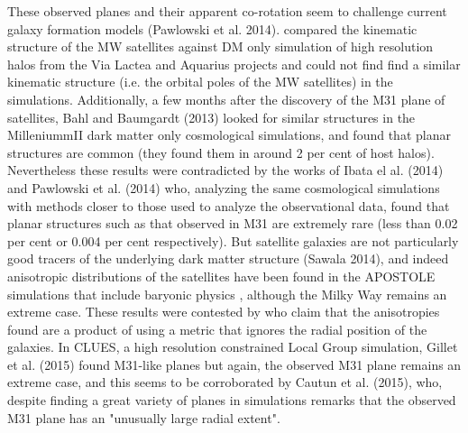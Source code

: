 These observed planes and their apparent co-rotation seem to challenge
current galaxy formation models (Pawlowski et al. 2014).
\cite{2012MNRAS.424...80P} compared the kinematic structure of the MW
satellites against DM only simulation of high resolution halos from
the Via Lactea and Aquarius projects and could not find find a similar
kinematic structure (i.e. the orbital poles of the MW satellites) in
the simulations. Additionally, a few months after the discovery of the
M31 plane of satellites, Bahl and Baumgardt (2013) looked for similar
structures in the MilleniummII dark matter only cosmological
simulations, and found that planar structures are common (they found
them in around 2 per cent of host halos). Nevertheless these results
were contradicted by the works of Ibata el al. (2014) and Pawlowski et
al. (2014) who, analyzing the same cosmological simulations with
methods closer to those used to analyze the observational data, found
that planar structures such as that observed in M31 are extremely rare
(less than 0.02 per cent or 0.004 per cent respectively). But
satellite galaxies are not particularly good tracers of the underlying
dark matter structure (Sawala 2014), and indeed anisotropic
distributions of the satellites have been found in the APOSTOLE
simulations that include baryonic physics \citep{2016MNRAS.457.1931S},
although the Milky Way remains an extreme case. These results were
contested by \cite{2015ApJ...815...19P} who claim that the
anisotropies found are a product of using a metric that ignores the
radial position of the galaxies. %
In CLUES, a high resolution constrained Local Group simulation,
Gillet et al. (2015) found M31-like planes but again, the observed M31 plane
remains an extreme case, and this seems to be corroborated by Cautun
et al. (2015), who, despite finding a great variety of planes in
simulations remarks that the observed M31 plane has an "unusually large
radial extent".\\  

